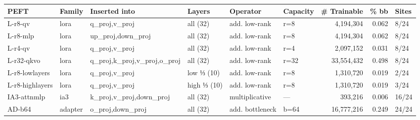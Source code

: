 \begin{tabular}{llllllrr l}
\toprule
PEFT & Family & Inserted into & Layers & Operator & Capacity & \# Trainable & \% bb & Sites \\
\midrule
L-r8-qv & lora & q\_proj,v\_proj & all (32) & add. low-rank & r=8 & 4,194,304 & 0.062 & 8/24 \\
L-r8-mlp & lora & up\_proj,down\_proj & all (32) & add. low-rank & r=8 & 4,194,304 & 0.062 & 8/24 \\
L-r4-qv & lora & q\_proj,v\_proj & all (32) & add. low-rank & r=4 & 2,097,152 & 0.031 & 8/24 \\
L-r32-qkvo & lora & q\_proj,k\_proj,v\_proj,o\_proj & all (32) & add. low-rank & r=32 & 33,554,432 & 0.498 & 8/24 \\
L-r8-lowlayers & lora & q\_proj,v\_proj & low ⅓ (10) & add. low-rank & r=8 & 1,310,720 & 0.019 & 2/24 \\
L-r8-highlayers & lora & q\_proj,v\_proj & high ⅓ (10) & add. low-rank & r=8 & 1,310,720 & 0.019 & 3/24 \\
IA3-attnmlp & ia3 & k\_proj,v\_proj,down\_proj & all (32) & multiplicative & — & 393,216 & 0.006 & 16/24 \\
AD-b64 & adapter & o\_proj,down\_proj & all (32) & add. bottleneck & b=64 & 16,777,216 & 0.249 & 24/24 \\
\bottomrule
\end{tabular}
